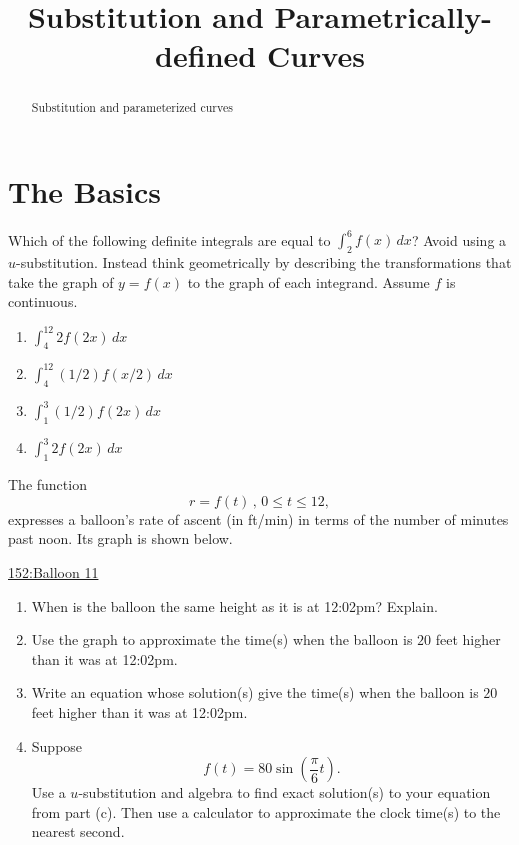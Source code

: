\documentclass{ximera}
\title{Substitution and Parametrically-defined Curves}
\begin{document}
\begin{abstract}
Substitution and parameterized curves
\end{abstract}
\maketitle

\section{The Basics}

\begin{question} \label{QkJDFE33d}
Which of the following definite integrals are equal to $\int_2^6 f(x)\, dx$? Avoid using a $u$-substitution. Instead think geometrically by describing the transformations that take the graph of $y=f(x)$ to the graph of each integrand. Assume $f$ is continuous.

\begin{enumerate}
\item $\int_4^{12} 2f(2x)\, dx$

\item $\int_4^{12} (1/2) f(x/2)\, dx$

\item $\int_1^{3} (1/2)f(2x)\, dx$

\item $\int_1^{3} 2f(2x)\, dx$
\end{enumerate}
\end{question}


\begin{question} \label{Q99frr3fds}
The function 
\[
     r = f(t) \, , \, 0\leq t \leq 12,
\]
expresses a balloon's rate of ascent (in ft/min) in terms of the number of minutes past noon. Its graph is shown below.

\begin{onlineOnly}
    \begin{center}
\end{center}
\end{onlineOnly}

\href{https://www.desmos.com/calculator/yp3awkyck8}{152:Balloon 11}

\begin{enumerate}
\item When is the balloon the same height as it is at 12:02pm? Explain.

\item Use the graph to approximate the time(s) when the balloon is $20$ feet higher than it was at 12:02pm.

\item Write an equation whose solution(s) give the time(s) when the balloon is $20$ feet higher than it was at 12:02pm.

\item Suppose
\[
      f(t)=80\sin\left( \frac{\pi}{6}t \right) .
\]
Use a $u$-substitution and algebra to find exact solution(s) to your equation from part (c). Then use a calculator to approximate the clock time(s) to the nearest second.
\end{enumerate}
\end{question}
\end{document}
